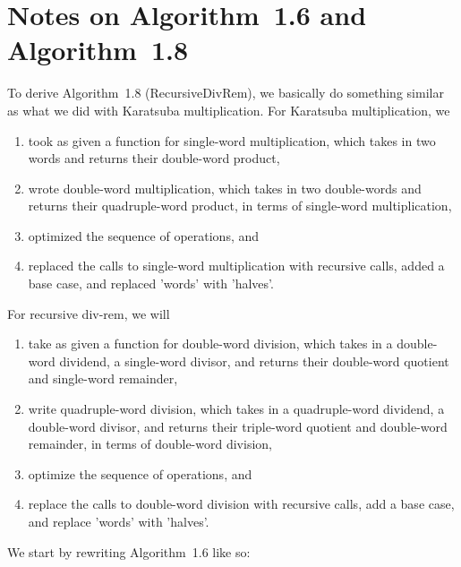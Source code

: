 \documentclass{computer-arithmetic}
\begin{document}
\section{Notes on Algorithm~1.6 and Algorithm~1.8}

To derive Algorithm~1.8 (RecursiveDivRem), we basically do something
similar as what we did with Karatsuba multiplication. For Karatsuba
multiplication, we
\begin{enumerate}
\item took as given a function for single-word multiplication, which
  takes in two words and returns their double-word product,
\item wrote double-word multiplication, which takes in two
  double-words and returns their quadruple-word product, in terms of
  single-word multiplication,
\item optimized the sequence of operations, and
\item replaced the calls to single-word multiplication with recursive
  calls, added a base case, and replaced 'words' with 'halves'.
\end{enumerate}

For recursive div-rem, we will
\begin{enumerate}
\item take as given a function for double-word division, which takes
  in a double-word dividend, a single-word divisor, and returns their
  double-word quotient and single-word remainder,
\item write quadruple-word division, which takes in a quadruple-word
  dividend, a double-word divisor, and returns their triple-word
  quotient and double-word remainder, in terms of double-word
  division,
\item optimize the sequence of operations, and
\item replace the calls to double-word division with recursive calls,
  add a base case, and replace 'words' with 'halves'.
\end{enumerate}

We start by rewriting Algorithm~1.6 like so:
\end{document}
